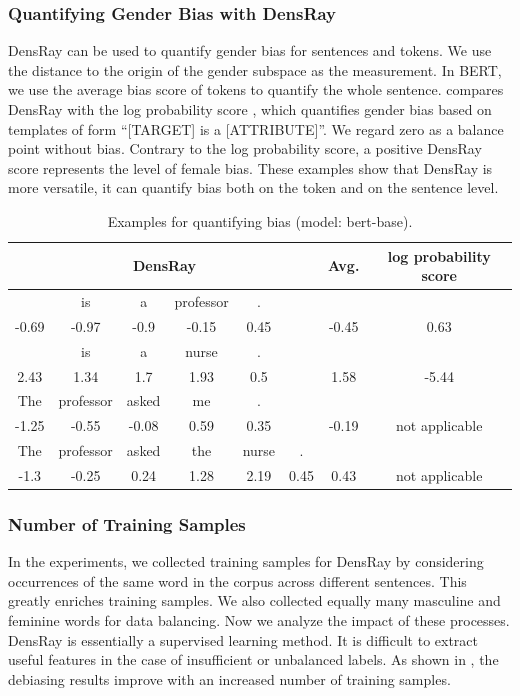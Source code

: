 \subsubsection{Quantifying Gender Bias with DensRay}
DensRay can be used to quantify gender bias for sentences
and tokens. We use the distance to the origin of the gender
subspace as the measurement. In BERT, we use the average
bias score of tokens to quantify the whole
sentence.  compares DensRay with the log
probability score \cite{kurita2019measuring}, which
quantifies gender bias based on templates of form ``[TARGET]
is a [ATTRIBUTE]''. We regard zero as a balance point
without bias. Contrary to the log probability score, a
positive DensRay score represents the level of female
bias. These examples show that DensRay is more versatile, it
can quantify  bias both on the token and on the sentence level.
\begin{table}[h]
	\centering
	\scriptsize
	\begin{tabular}{cccccc|c||c}
		\hline
		\multicolumn{6}{c|}{DensRay}&Avg.&log probability score\\		
		\hline\hline
		[MASK] &is &a &professor& . &&&\\
		-0.69 &-0.97 &-0.9  &-0.15  &0.45& &-0.45& 0.63\\
		\hline
		[MASK] &is &a &nurse& . &&&\\
		2.43  &1.34  &1.7   &1.93  &0.5&& 1.58 &-5.44\\
		\hline
		The &professor &asked &me& . &&&\\
		-1.25 &-0.55 &-0.08  &0.59  &0.35 &&-0.19 &
                not applicable\\
		\hline
		The &professor &asked &the&nurse &.&&\\
		-1.3&  -0.25  &0.24  &1.28  &2.19
                &0.45&0.43& not applicable\\
		\hline
	\end{tabular}
	\caption{
		Examples for quantifying bias (model: bert-base).}
\end{table}



\subsubsection{Number of Training Samples}
In the experiments, we collected training samples for DensRay by considering occurrences of the same word in the corpus across different sentences. This greatly enriches training samples. We also collected equally many masculine and feminine words for data balancing. Now we analyze the impact of these processes. DensRay is essentially a supervised learning method. It is difficult to extract useful features in the case of insufficient or unbalanced labels.  As shown in , the debiasing results improve with an increased number of training samples.

